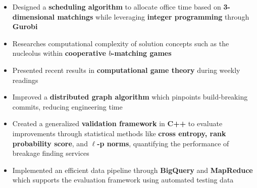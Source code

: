 \documentclass[10pt,a4paper,ragged2e]{altacv}
\begin{document}

\begin{fullwidth}
    \makecvheader
\end{fullwidth}



\begin{itemize}
    \item Designed a \textbf{scheduling algorithm} to allocate office time
      based on \textbf{3-dimensional matchings} while leveraging \textbf{integer programming} through \textbf{Gurobi}
    \item Researches computational complexity of solution concepts such as the nucleolus
      within \textbf{cooperative $b$-matching games}
    \item Presented recent results in \textbf{computational game theory} during weekly readings
\end{itemize}

\divider

\begin{itemize}
    \item Improved a \textbf{distributed graph algorithm} which pinpoints build-breaking commits,
      reducing engineering time
    \item Created a generalized \textbf{validation framework} in \textbf{C++} to evaluate improvements
      through statistical methods like \textbf{cross entropy, rank probability score}, and \textbf{$\ell$-p norms},
      quantifying the performance of breakage finding services
    \item Implemented an efficient data pipeline through \textbf{BigQuery} and \textbf{MapReduce}
      which supports the evaluation framework using automated testing data
\end{itemize}
\end{document}
